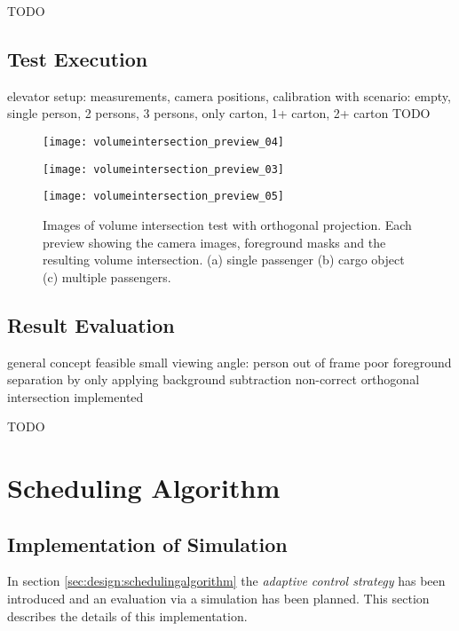 TODO
\subsection{Test Execution}
elevator setup: measurements, camera positions, calibration with \autocite[][]{smid2015calibration}
scenario: empty, single person, 2 persons, 3 persons, only carton, 1+ carton, 2+ carton
TODO

\begin{figure}[p]
    \centering
    \texttt{[image: volumeintersection\_preview\_04]}
    
    \vspace{0.5em}
    
    \texttt{[image: volumeintersection\_preview\_03]}
    
    \vspace{0.5em}
    
    \texttt{[image: volumeintersection\_preview\_05]}
    
    \caption[Images of volume intersection test with orthogonal projection]{Images of volume intersection test with orthogonal projection. Each preview showing the camera images, foreground masks and the resulting volume intersection. (a) single passenger (b) cargo object (c) multiple passengers.}
    \label{fig:impl:preview}
\end{figure}

\subsection{Result Evaluation}
general concept feasible
small viewing angle: person out of frame
poor foreground separation by only applying background subtraction
non-correct orthogonal intersection implemented

TODO

\section{Scheduling Algorithm}
\subsection{Implementation of Simulation}
In section \ref{sec:design:schedulingalgorithm} the \emph{adaptive control strategy} has been introduced and an evaluation via a simulation has been planned.
This section describes the details of this implementation.

